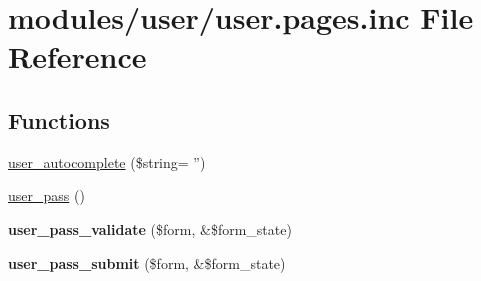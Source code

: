 \hypertarget{user_8pages_8inc}{
\section{modules/user/user.pages.inc File Reference}
\label{user_8pages_8inc}
}
\subsection*{Functions}
\begin{CompactItemize}
\item 
\hyperlink{user_8pages_8inc_3a77600d6ab7b9af11a3692207b5533a}{user\_\-autocomplete} (\$string= '')
\item 
\hyperlink{group__forms_gd7f952e136ebcff493ca8de7209100cf}{user\_\-pass} ()
\item 
\hypertarget{user_8pages_8inc_518f9714e8a92fe4ad96560928dba138}{
\textbf{user\_\-pass\_\-validate} (\$form, \&\$form\_\-state)}
\label{user_8pages_8inc_518f9714e8a92fe4ad96560928dba138}

\item 
\hypertarget{user_8pages_8inc_e3bac17377ceac5fa4e81efbe0ebfebf}{
\textbf{user\_\-pass\_\-submit} (\$form, \&\$form\_\-state)}
\label{user_8pages_8inc_e3bac17377ceac5fa4e81efbe0ebfebf}


\end{CompactItemize}
